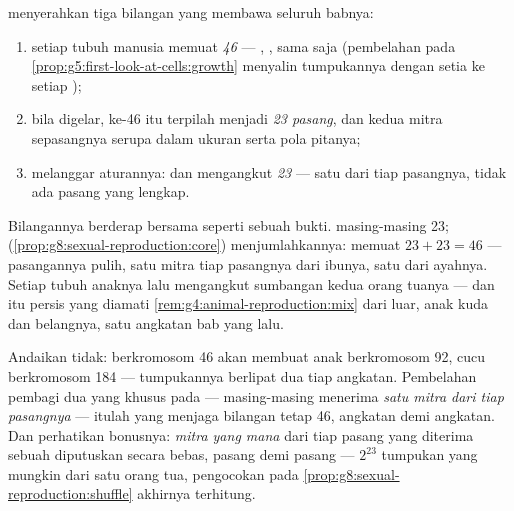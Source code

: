 \begin{proposition}\label{prop:g9:chromosomes:counts}
 menyerahkan tiga bilangan yang membawa seluruh
babnya:
\begin{enumerate}
  \item setiap  tubuh manusia memuat \emph{46} 
        --- , ,  sama saja (pembelahan pada
        \cref{prop:g5:first-look-at-cells:growth} menyalin
        tumpukannya dengan setia ke setiap );
  \item bila digelar, ke-46 itu terpilah menjadi \emph{23
        pasang}, dan kedua mitra sepasangnya serupa dalam
        ukuran serta pola pitanya;
  \item \emph{} melanggar aturannya:  dan
         mengangkut \emph{23} --- satu 
        dari tiap pasangnya, tidak ada pasang yang lengkap.
\end{enumerate}
\end{proposition}
\admitted

\begin{example}\label{ex:g9:chromosomes:arithmetic}
Bilangannya berderap bersama seperti sebuah bukti. 
masing-masing 23; 
(\cref{prop:g8:sexual-reproduction:core}) menjumlahkannya:
 memuat $23 + 23 = 46$ --- pasangannya pulih, satu
mitra tiap pasangnya dari ibunya, satu dari ayahnya. Setiap
 tubuh anaknya lalu mengangkut sumbangan kedua orang
tuanya --- dan itu persis yang diamati
\cref{rem:g4:animal-reproduction:mix} dari luar, anak kuda
dan belangnya, satu angkatan bab yang lalu.
\end{example}

\begin{remark}\label{rem:g9:chromosomes:whyhalve}
Andaikan tidak:  berkromosom 46 akan membuat anak
berkromosom 92, cucu berkromosom 184 --- tumpukannya
berlipat dua tiap angkatan. Pembelahan pembagi dua yang
khusus pada  --- masing-masing menerima \emph{satu
mitra dari tiap pasangnya} --- itulah yang menjaga bilangan
 tetap 46, angkatan demi angkatan. Dan perhatikan
bonusnya: \emph{mitra yang mana} dari tiap pasang yang
diterima sebuah  diputuskan secara bebas, pasang demi
pasang --- $2^{23}$ tumpukan yang mungkin dari satu orang
tua, pengocokan pada
\cref{prop:g8:sexual-reproduction:shuffle} akhirnya terhitung.
\end{remark}

